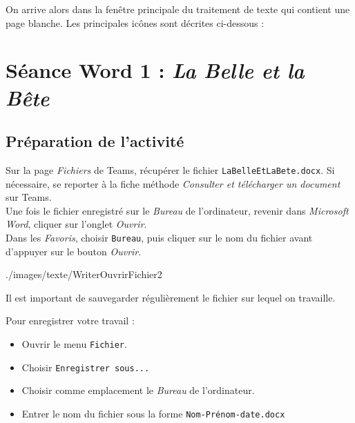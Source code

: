
On arrive alors dans la fenêtre principale du traitement de texte qui contient une page blanche. Les principales icônes sont décrites ci-dessous :





%
%
%
%




\section{Séance Word 1 : \emph{La Belle et la Bête}}

\subsection{Préparation de l'activité}

Sur la page \emph{Fichiers} de Teams, récupérer le fichier \texttt{LaBelleEtLaBete.docx}. Si nécessaire, se reporter à la fiche méthode \emph{Consulter et télécharger un document} sur Teams.\\

Une fois le fichier enregistré sur le \emph{Bureau} de l'ordinateur, revenir dans \emph{Microsoft Word}, cliquer sur l'onglet \emph{Ouvrir}.\\

Dans les \emph{Favoris}, choisir \texttt{Bureau}, puis cliquer sur le nom du fichier avant d'appuyer sur le bouton \emph{Ouvrir}.      

%
                {./images/texte/WriterOuvrirFichier2}{\textwidth}




Il est important de sauvegarder régulièrement le fichier sur lequel on travaille.

Pour enregistrer votre travail :
\begin{itemize}
\item Ouvrir le menu \texttt{Fichier}.
\item Choisir \texttt{Enregistrer sous...}
\item Choisir comme emplacement le \emph{Bureau} de l'ordinateur.
\item Entrer le nom du fichier sous la forme \texttt{Nom-Prénom-date.docx}
\end{itemize}

